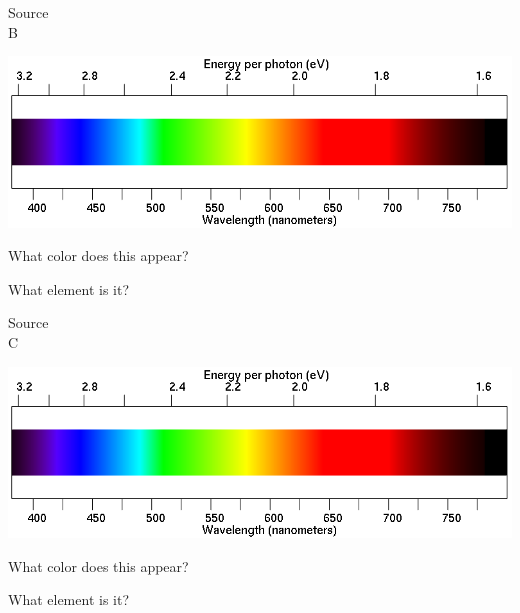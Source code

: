 \documentclass[11pt]{article}
\begin{document}
\vspace{1in}

\begin{minipage}{0.1\textwidth}
	\begin{center}
		\Large Source \\ B
	\end{center}
\end{minipage}
\begin{minipage}{0.8\textwidth}
	\includegraphics[width=\textwidth]{spectrum2.png}
\end{minipage}

\begin{minipage}{0.5\textwidth}
	What color does this appear?
\end{minipage}
\begin{minipage}{0.5\textwidth}
	What element is it?
\end{minipage}
\newpage
\begin{minipage}{0.1\textwidth}
	\begin{center}
		\Large Source \\ C
	\end{center}
\end{minipage}
\begin{minipage}{0.8\textwidth}
	\includegraphics[width=\textwidth]{spectrum2.png}
\end{minipage}

\begin{minipage}{0.5\textwidth}
	What color does this appear?
\end{minipage}
\begin{minipage}{0.5\textwidth}
	What element is it?
\end{minipage}
\end{document}
